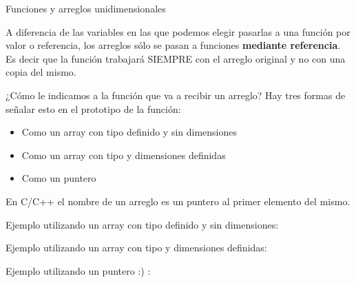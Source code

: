 \documentclass[xcolor=pdftex,table,11pt]{beamer}
\begin{document}
\begin{frame}[allowframebreaks]{Funciones y arreglos unidimensionales}
\begin{block}{}
A diferencia de las variables en las que podemos elegir pasarlas a una función por valor o referencia, los arreglos sólo se pasan a funciones \textbf{mediante referencia}.\\
Es decir que la función trabajará SIEMPRE con el arreglo original y no con una copia del mismo.
\end{block}


\begin{block}{¿Cómo le indicamos a la función que va a recibir un arreglo?}
Hay tres formas de señalar esto en el prototipo de la función:
\begin{itemize}
\item Como un array con tipo definido y sin dimensiones
\item Como un array con tipo y dimensiones definidas
\item Como un puntero

\end{itemize}


\end{block}
En C/C++ el nombre de un arreglo es un puntero al primer elemento del mismo.


\newpage
Ejemplo utilizando un array con tipo definido y sin dimensiones:
\codesetstylefrombeamer
{}

\href{https://github.com/danis963/informaticaI_IUA/blob/main/c/src/7-func_array_1d.c}{}

\newpage
Ejemplo utilizando un array con tipo y dimensiones definidas:
\codesetstylefrombeamer
{}

\href{https://github.com/danis963/informaticaI_IUA/blob/main/c/src/7-2func_array_1d.c}{}



\newpage
Ejemplo utilizando un puntero :) :
\codesetstylefrombeamer
{}

\href{https://github.com/danis963/informaticaI_IUA/blob/main/c/src/7-3func_array_1d.c}{}
\end{frame}
\end{document}
